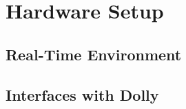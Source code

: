 \documentclass[ExampleMasters.tex]{subfiles}
\begin{document}
\chapter{Hardware Setup}


\section{Real-Time Environment}

\section{Interfaces with Dolly}

\section{}
\end{document}
